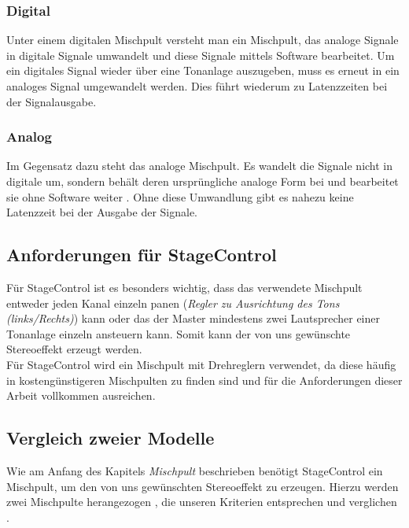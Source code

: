 \subsubsection{Digital}
Unter einem digitalen Mischpult versteht man ein Mischpult, das analoge Signale in digitale Signale umwandelt und diese Signale mittels Software bearbeitet. Um ein digitales Signal wieder über eine Tonanlage auszugeben, muss es erneut in ein analoges Signal umgewandelt werden. Dies führt wiederum zu Latenzzeiten bei der Signalausgabe.
\subsubsection{Analog}
Im Gegensatz dazu steht das analoge Mischpult. Es wandelt die Signale nicht in digitale um, sondern behält deren ursprüngliche analoge Form bei und bearbeitet sie ohne Software weiter \textcite{MischpultAnalogDigital}. Ohne diese Umwandlung gibt es nahezu keine Latenzzeit bei der Ausgabe der Signale. \\


\subsection{Anforderungen für StageControl}
Für StageControl ist es besonders wichtig, dass das verwendete Mischpult entweder jeden Kanal einzeln panen (\emph{Regler zu Ausrichtung des Tons (links/Rechts)}) kann oder das der Master mindestens zwei Lautsprecher einer Tonanlage einzeln ansteuern kann. Somit kann der von uns gewünschte Stereoeffekt erzeugt werden. \\
Für StageControl wird ein Mischpult mit Drehreglern verwendet, da diese häufig in kostengünstigeren Mischpulten zu finden sind und für die Anforderungen dieser Arbeit vollkommen ausreichen. 



\subsection{Vergleich zweier Modelle}
Wie am Anfang des Kapitels \emph{Mischpult} beschrieben benötigt StageControl ein Mischpult, um den von uns gewünschten Stereoeffekt zu erzeugen. Hierzu werden zwei Mischpulte herangezogen \textcite{MischpultKriterien1204}, die unseren Kriterien entsprechen und  verglichen  \textcite{MischpultKriterien1402}.

